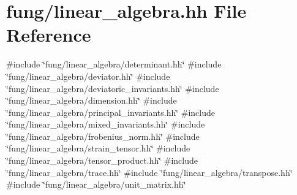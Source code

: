 \hypertarget{linear__algebra_8hh}{\section{fung/linear\-\_\-algebra.hh \-File \-Reference}
\label{linear__algebra_8hh}
}
{\ttfamily \#include \char`\"{}fung/linear\-\_\-algebra/determinant.\-hh\char`\"{}}\*
{\ttfamily \#include \char`\"{}fung/linear\-\_\-algebra/deviator.\-hh\char`\"{}}\*
{\ttfamily \#include \char`\"{}fung/linear\-\_\-algebra/deviatoric\-\_\-invariants.\-hh\char`\"{}}\*
{\ttfamily \#include \char`\"{}fung/linear\-\_\-algebra/dimension.\-hh\char`\"{}}\*
{\ttfamily \#include \char`\"{}fung/linear\-\_\-algebra/principal\-\_\-invariants.\-hh\char`\"{}}\*
{\ttfamily \#include \char`\"{}fung/linear\-\_\-algebra/mixed\-\_\-invariants.\-hh\char`\"{}}\*
{\ttfamily \#include \char`\"{}fung/linear\-\_\-algebra/frobenius\-\_\-norm.\-hh\char`\"{}}\*
{\ttfamily \#include \char`\"{}fung/linear\-\_\-algebra/strain\-\_\-tensor.\-hh\char`\"{}}\*
{\ttfamily \#include \char`\"{}fung/linear\-\_\-algebra/tensor\-\_\-product.\-hh\char`\"{}}\*
{\ttfamily \#include \char`\"{}fung/linear\-\_\-algebra/trace.\-hh\char`\"{}}\*
{\ttfamily \#include \char`\"{}fung/linear\-\_\-algebra/transpose.\-hh\char`\"{}}\*
{\ttfamily \#include \char`\"{}fung/linear\-\_\-algebra/unit\-\_\-matrix.\-hh\char`\"{}}\*
